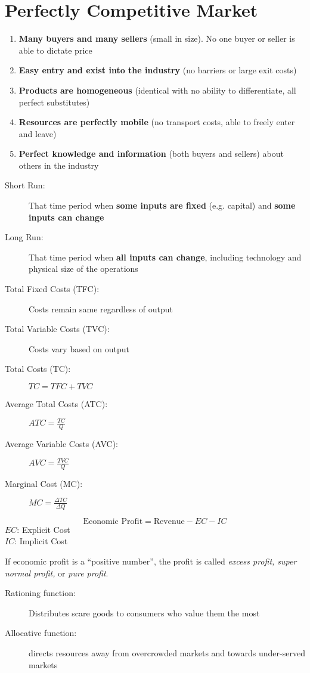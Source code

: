 \section{Perfectly Competitive Market}
\begin{enumerate}
	\item\textbf{Many buyers and many sellers} (small in size). No one buyer or seller is able to dictate price
	\item\textbf{Easy entry and exist into the industry} (no barriers or large exit costs)
	\item\textbf{Products are homogeneous} (identical with no ability to differentiate, all perfect substitutes)
	\item\textbf{Resources are perfectly mobile} (no transport costs, able to freely enter and leave)
	\item\textbf{Perfect knowledge and information} (both buyers and sellers) about others in the industry
\end{enumerate}
\begin{description}
	\item[Short Run:] That time period when \textbf{some inputs are fixed} (e.g. capital) and \textbf{some inputs can change}
	\item[Long Run:] That time period when \textbf{all inputs can change}, including technology and physical size of the operations
	\item[Total Fixed Costs (TFC):] Costs remain same regardless of output
	\item[Total Variable Costs (TVC):] Costs vary based on output
	\item[Total Costs (TC):] $TC = TFC + TVC$
	\item[Average Total Costs (ATC):] $ATC=\frac{TC}{Q}$
	\item[Average Variable Costs (AVC):] $AVC=\frac{TVC}{Q}$
	\item[Marginal Cost (MC):] $MC=\frac{\Delta TC}{\Delta Q}$
\end{description}

$$\text{Economic Profit} = \text{Revenue} - EC - IC$$
$EC$: Explicit Cost\\
$IC$: Implicit Cost
\begin{leftbar}
	If economic profit is a ``positive number'', the profit is called \textit{excess profit, super normal profit,} or \textit{pure profit}.
\end{leftbar}

\begin{description}
	\item[Rationing function:] Distributes scare goods to consumers who value them the most
	\item[Allocative function:] directs resources away from overcrowded markets and towards under-served markets
\end{description}

